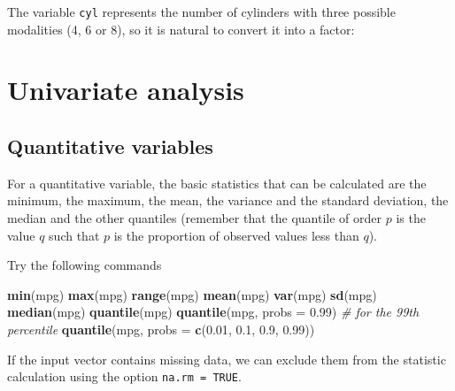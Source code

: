 \documentclass[]{book}
\newenvironment{Shaded}{\begin{snugshade}}{\end{snugshade}}
\newcommand{\CommentTok}[1]{\textcolor[rgb]{0.56,0.35,0.01}{\textit{#1}}}
\newcommand{\DataTypeTok}[1]{\textcolor[rgb]{0.13,0.29,0.53}{#1}}
\newcommand{\FloatTok}[1]{\textcolor[rgb]{0.00,0.00,0.81}{#1}}
\newcommand{\KeywordTok}[1]{\textcolor[rgb]{0.13,0.29,0.53}{\textbf{#1}}}
\newcommand{\NormalTok}[1]{#1}
\newcommand{\OperatorTok}[1]{\textcolor[rgb]{0.81,0.36,0.00}{\textbf{#1}}}
\newcommand{\StringTok}[1]{\textcolor[rgb]{0.31,0.60,0.02}{#1}}
\begin{document}
The variable \texttt{cyl} represents the number of cylinders with three possible modalities (4, 6 or 8), so it is natural to convert it into a factor:

\begin{Shaded}
\end{Shaded}

\hypertarget{univariate-analysis}{%
\section{Univariate analysis}\label{univariate-analysis}}

\hypertarget{quant-var}{%
\subsection{Quantitative variables}\label{quant-var}}

For a quantitative variable, the basic statistics that can be calculated are the minimum, the maximum, the mean, the variance and the standard deviation, the median and the other quantiles (remember that the quantile of order \(p\) is the value \(q\) such that \(p\) is the proportion of observed values less than \(q\)).

Try the following commands

\begin{Shaded}
\begin{Highlighting}[]
\KeywordTok{min}\NormalTok{(mpg)}
\KeywordTok{max}\NormalTok{(mpg)}
\KeywordTok{range}\NormalTok{(mpg)}
\KeywordTok{mean}\NormalTok{(mpg)}
\KeywordTok{var}\NormalTok{(mpg)}
\KeywordTok{sd}\NormalTok{(mpg)}
\KeywordTok{median}\NormalTok{(mpg)}
\KeywordTok{quantile}\NormalTok{(mpg)}
\KeywordTok{quantile}\NormalTok{(mpg, }\DataTypeTok{probs =} \FloatTok{0.99}\NormalTok{) }\CommentTok{# for the 99th percentile}
\KeywordTok{quantile}\NormalTok{(mpg, }\DataTypeTok{probs =} \KeywordTok{c}\NormalTok{(}\FloatTok{0.01}\NormalTok{, }\FloatTok{0.1}\NormalTok{, }\FloatTok{0.9}\NormalTok{, }\FloatTok{0.99}\NormalTok{))}
\end{Highlighting}
\end{Shaded}

If the input vector contains missing data, we can exclude them from the statistic calculation using the option \texttt{na.rm\ =\ TRUE}.
\end{document}
